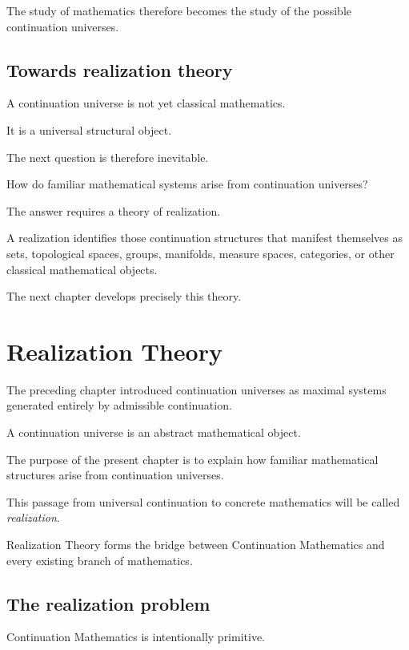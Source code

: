 \documentclass[13pt,openany]{book}
\theoremstyle{plain}
\theoremstyle{definition}
\begin{document}
The study of mathematics therefore becomes the study of the possible continuation universes.


\section{Towards realization theory}

A continuation universe is not yet classical mathematics.

It is a universal structural object.

The next question is therefore inevitable.

How do familiar mathematical systems arise from continuation universes?

The answer requires a theory of realization.

A realization identifies those continuation structures that manifest themselves as sets, topological spaces, groups, manifolds, measure spaces, categories, or other classical mathematical objects.

The next chapter develops precisely this theory.

\chapter{Realization Theory}

The preceding chapter introduced continuation universes as maximal systems generated entirely by admissible continuation.

A continuation universe is an abstract mathematical object.

The purpose of the present chapter is to explain how familiar mathematical structures arise from continuation universes.

This passage from universal continuation to concrete mathematics will be called \emph{realization}.

Realization Theory forms the bridge between Continuation Mathematics and every existing branch of mathematics.


\section{The realization problem}

Continuation Mathematics is intentionally primitive.
\end{document}
